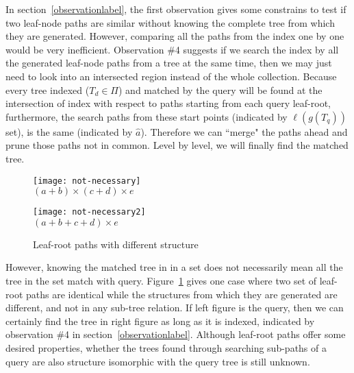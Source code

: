 In section~\ref{observationlabel}, the first observation gives some constrains to test if two leaf-node paths are similar without knowing the complete tree from which they are generated.
However, comparing all the paths from the index one by one would be very inefficient. Observation \#4 suggests if we search the index by all the generated leaf-node paths from a tree at the same time, then we may just need to look into an intersected region instead of the whole collection.
Because every tree indexed ($T_d \in \Pi$) and matched by the query will be found at the intersection of index with respect to paths starting from each query leaf-root, 
furthermore, the search paths from these start points (indicated by $\ell(g(T_q))$ set), is the same (indicated by $\hat{a}$). Therefore we can ``merge" the paths ahead and prune those paths not in common. Level by level, we will finally find the matched tree.

\begin{figure}
\begin{minipage}[b]{2.65in}
\begin{center}
\texttt{[image: not-necessary]}
\\ $(a+b) \times (c+d) \times e$
\end{center}
\end{minipage}
\hspace*{.38in}
\begin{minipage}[b]{2.65in}
\begin{center}
{\texttt{[image: not-necessary2]}}
\\ $(a+b+c+d) \times e$
\end{center}
\end{minipage}
\caption{Leaf-root paths with different structure}\label{notnecessary}
\end{figure}

However, knowing the matched tree in in a set does not necessarily mean all the tree in the set match with query. 
Figure~\ref{notnecessary} gives one case where two set of leaf-root paths are identical while the structures from which they are generated are different, and not in any sub-tree relation. If left figure is the query, then we can certainly find the tree in right figure as long as it is indexed, indicated by observation \#4 in section~\ref{observationlabel}.
Although leaf-root paths offer some desired properties, whether the trees found through searching sub-paths of a query are also structure isomorphic with the query tree is still unknown. 

